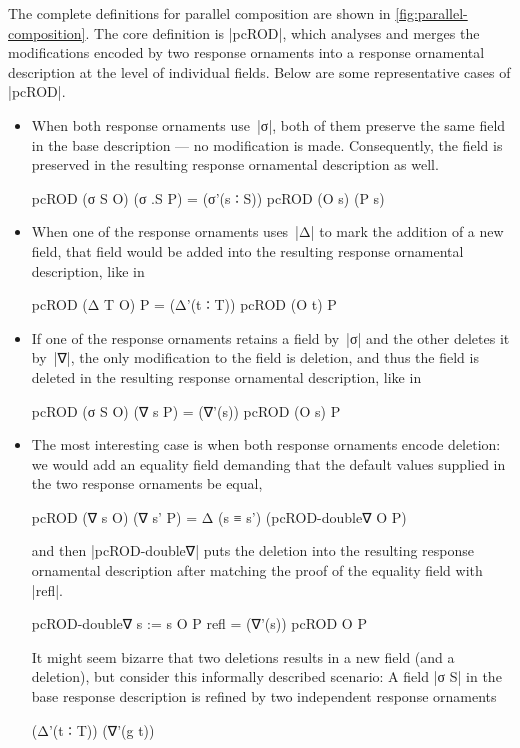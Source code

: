 The complete definitions for parallel composition are shown in \autoref{fig:parallel-composition}.
The core definition is |pcROD|, which analyses and merges the modifications encoded by two response ornaments into a response ornamental description at the level of individual fields.
Below are some representative cases of |pcROD|.
\begin{itemize}
\item When both response ornaments use~|σ|, both of them preserve the same field in the base description --- no modification is made.
Consequently, the field is preserved in the resulting response ornamental description as well.
\begin{code}
pcROD (σ S O) (σ .S P) = (σ'(s ∶ S)) pcROD (O s) (P s)
\end{code}
\item When one of the response ornaments uses~|Δ| to mark the addition of a new field, that field would be added into the resulting response ornamental description, like in
\begin{code}
pcROD (Δ T O) P = (Δ'(t ∶ T)) pcROD (O t) P
\end{code}
\item If one of the response ornaments retains a field by~|σ| and the other deletes it by~|∇|, the only modification to the field is deletion, and thus the field is deleted in the resulting response ornamental description, like in
\begin{code}
pcROD (σ S O) (∇ s P) = (∇'(s)) pcROD (O s) P
\end{code}
\item The most interesting case is when both response ornaments encode deletion: we would add an equality field demanding that the default values supplied in the two response ornaments be equal,
\begin{code}
pcROD (∇ s O) (∇ s' P) = Δ (s ≡ s') (pcROD-double∇ O P)
\end{code}
and then |pcROD-double∇| puts the deletion into the resulting response ornamental description after matching the proof of the equality field with |refl|.
\begin{code}
pcROD-double∇ {s := s} O P refl = (∇'(s)) pcROD O P
\end{code}
It might seem bizarre that two deletions results in a new field (and a deletion), but consider this informally described scenario:
A field |σ S| in the base response description is refined by two independent response ornaments
\savecolumns
\begin{code}
(Δ'(t ∶ T))  (∇'(g t))

\end{code}
\end{itemize}
